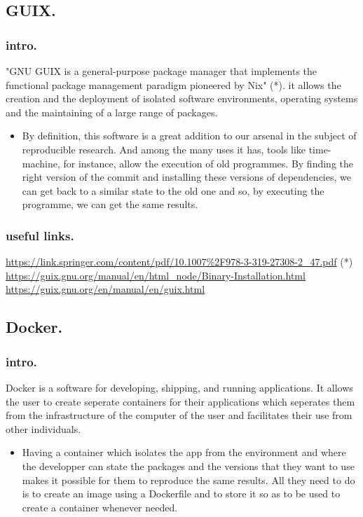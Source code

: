 \documentclass[11pt]{article}
\begin{document}
\subsection{GUIX.}
\label{sec:orge1c2e84}
\subsubsection{intro.}
\label{sec:org68e4c78}
"GNU GUIX is a general-purpose package manager that implements 
the functional package management paradigm pioneered by Nix" (*). it
allows the creation and the deployment of isolated software
environments, operating systems and the maintaining of a large
range of packages.
\begin{itemize}
\item By definition, this software is a great addition to our arsenal
in the subject of reproducible research. And among the many uses it
has, tools like time-machine, for instance, allow the execution of
old programmes. By finding the right version of the commit and
installing these versions of dependencies, we can get back to a
similar state to the old one and so, by executing the programme, we
can get the same results.
\end{itemize}
\subsubsection{useful links.}
\label{sec:org13689ee}
\url{https://link.springer.com/content/pdf/10.1007\%2F978-3-319-27308-2\_47.pdf} (*)
\url{https://guix.gnu.org/manual/en/html\_node/Binary-Installation.html}
\url{https://guix.gnu.org/en/manual/en/guix.html}


\subsection{Docker.}
\label{sec:org14bcd89}
\subsubsection{intro.}
\label{sec:org76439f1}
Docker is a software for developing, shipping, and running
applications. It allows the user to create seperate containers for
their applications which seperates them from the infrastructure of
the computer of the user and facilitates their use from other
individuals.
\begin{itemize}
\item Having a container which isolates the app from the environment
and where the developper can state the packages and the versions
that they want to use makes it possible for them to reproduce
the same results. All they need to do is to create an image
using a Dockerfile and to store it so as to be used to create a
container whenever needed.
\end{itemize}
\end{document}
